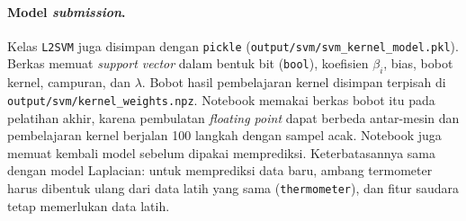 \paragraph{Model \textit{submission}.} Kelas \texttt{L2SVM} juga disimpan dengan \texttt{pickle} (\nolinkurl{output/svm/svm_kernel_model.pkl}). Berkas memuat \textit{support vector} dalam bentuk bit (\texttt{bool}), koefisien $\beta_i$, bias, bobot kernel, campuran, dan $\lambda$. Bobot hasil pembelajaran kernel disimpan terpisah di \nolinkurl{output/svm/kernel_weights.npz}. Notebook memakai berkas bobot itu pada pelatihan akhir, karena pembulatan \textit{floating point} dapat berbeda antar-mesin dan pembelajaran kernel berjalan 100 langkah dengan sampel acak. Notebook juga memuat kembali model sebelum dipakai memprediksi. Keterbatasannya sama dengan model Laplacian: untuk memprediksi data baru, ambang termometer harus dibentuk ulang dari data latih yang sama (\texttt{thermometer}), dan fitur saudara tetap memerlukan data latih.

